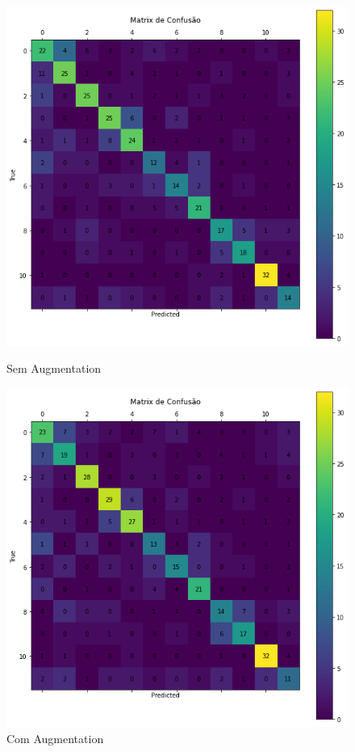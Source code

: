 \documentclass[12pt]{article}
\begin{document}
\begin{figure}[!htb]
  \begin{minipage}{.47\textwidth}
    \centering
    \includegraphics[width=1.1\linewidth]{experiments/svm_aug/confusion_matrix.png}
    \caption{Sem Augmentation}\label{fig:experiment_svm_aug}
  \end{minipage}\hfill
  \begin{minipage}{.47\textwidth}
    \centering
    \includegraphics[width=1.1\linewidth]{experiments/svm_noaug/confusion_matrix.png}
    \caption{Com Augmentation}\label{fig:experiment_svm_noaug}
  \end{minipage}
\end{figure}
\end{document}
